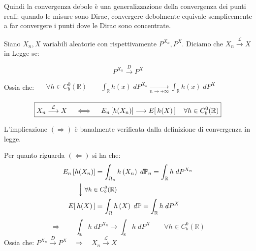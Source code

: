 Quindi la convergenza debole è una generalizzazione della convergenza dei punti reali: quando le misure sono Dirac, convergere debolmente equivale semplicemente a far convergere i punti dove le Dirac sono concentrate.

\begin{definizione}
    Siano $X_n, X$ variabili aleatorie con rispettivamente $P^{X_n}, P^X.$ Diciamo che $X_n\overset{\mathcal{L}}{\longrightarrow} X$ in Legge se:

    \[P^{X_n} \overset{D}{\longrightarrow} P^X\]

    Ossia che: $\quad \begin{aligned}\forall h\in C_b^0(\mathbb R)\qquad \int_\mathbb{R}h(x)\;dP^{X_n} \underset{n\to+\infty }{\longrightarrow} \int_\mathbb{R}h(x)\;dP^X\end{aligned}$
\end{definizione}

\begin{proposizione}
\label{prop:15.22}
    \[\boxed{X_n\overset{\mathcal{L}}{\longrightarrow} X\quad \iff \quad E_n\left[h(X_n)\right] \longrightarrow E\!\left[\,h(X)\,\right]\quad \forall h\in C^0_b(\mathbb{R})}\]

    \begin{dimostrazione}
        L'implicazione $(\Rightarrow)$ è banalmente verificata dalla definizione di convergenza in legge.

        \medskip
        \noindent Per quanto riguarda $(\Leftarrow)$ si ha che:
        \begin{align*}
        E_n\left[h(X_n)\right] & = \int_{\Omega_n} h\left(X_n\right)\;d\mathbb{P}_n = \int_\mathbb{R} h\;dP^{X_n} \\
        & \!\!\!\!\!\!\!\!\!\!\!\!\!\!\!\Big\downarrow \; \textit{\small$\forall h\in C^0_b(\mathbb{R})$}\\
        \E{h(X)} & = \int_{\Omega} h\left(X\right)\;d\mathbb{P} = \int_\mathbb{R} h\;dP^{X}
        \end{align*}
        \[\Rightarrow\qquad \int_\mathbb{R} h\;dP^{X_n} \longrightarrow \int_\mathbb{R} h\;dP^{X}\qquad \forall h\in C^0_b(\mathbb{R})\]
        Ossia che: $P^{X_n}\overset{D}{\longrightarrow} P^X \quad \Rightarrow\quad X_n\overset{\mathcal{L}}{\longrightarrow} X$
    \end{dimostrazione}
\end{proposizione}

